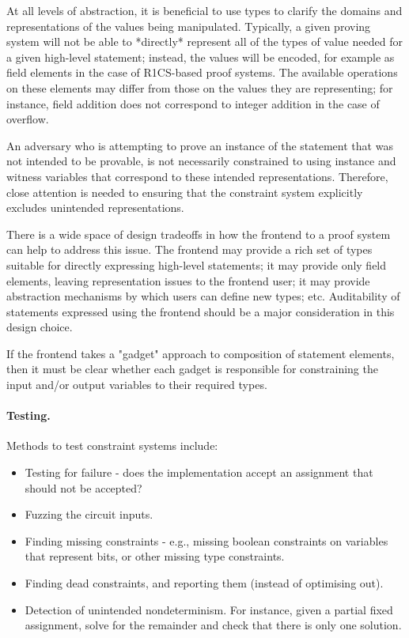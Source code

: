 At all levels of abstraction, it is beneficial to use types to clarify the domains and representations of the values being manipulated. Typically, a given proving system will not be able to *directly* represent all of the types of value needed for a given high-level statement; instead, the values will be encoded, for example as field elements in the case of R1CS-based proof systems. The available operations on these elements may differ from those on the values they are representing; for instance, field addition does not correspond to integer addition in the case of overflow.

An adversary who is attempting to prove an instance of the statement that was not intended to be provable, is not necessarily constrained to using instance and witness variables that correspond to these intended representations. Therefore, close attention is needed to ensuring that the constraint system explicitly excludes unintended representations.

There is a wide space of design tradeoffs in how the frontend to a proof system can help to address this issue. The frontend may provide a rich set of types suitable for directly expressing high-level statements; it may provide only field elements, leaving representation issues to the frontend user; it may provide abstraction mechanisms by which users can define new types; etc. Auditability of statements expressed using the frontend should be a major consideration in this design choice.

If the frontend takes a "gadget" approach to composition of statement elements, then it must be clear whether each gadget is responsible for constraining the input and/or output variables to their required types.


\paragraph{Testing.}
Methods to test constraint systems include:
\begin{itemize}[label={- }]
    \item Testing for failure - does the implementation accept an assignment that should not be accepted?
    \item Fuzzing the circuit inputs.
    \item Finding missing constraints - e.g., missing boolean constraints on variables that represent bits, or other missing type constraints.
    \item Finding dead constraints, and reporting them (instead of optimising out).
    \item Detection of unintended nondeterminism. For instance, given a partial fixed assignment, solve for the remainder and check that there is only one solution.
\end{itemize}

